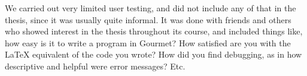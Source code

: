 We carried out very limited user testing, and did not include any of that in the thesis, since it was usually quite informal. It was done with friends and others who showed interest in the thesis throughout its course, and included things like, how easy is it to write a program in Gourmet? How satisfied are you with the LaTeX equivalent of the code you wrote? How did you find debugging, as in how descriptive and helpful were error messages? Etc.